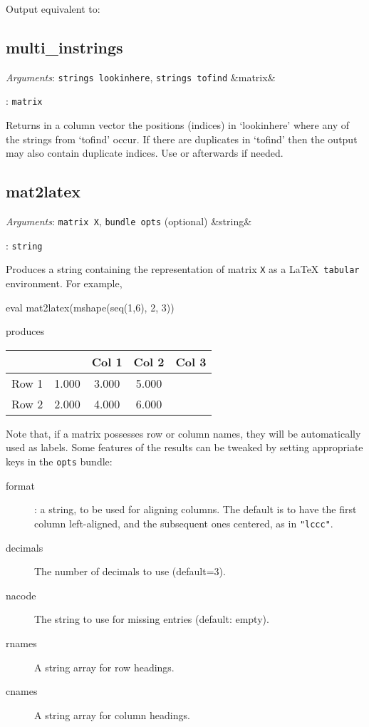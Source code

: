 \documentclass[11pt,english]{article}
\newcommand{\ArgRet}[2]{%
  {\it Arguments}: {#1}%
  \ifx&#2&%
  \else
  \par\smallskip\noindent {\it Return type}: \texttt{#2}
  \fi%
  \par\medskip\par%
  }
\begin{document}
Output equivalent to:


\subsection{multi\_instrings}

\ArgRet{\texttt{strings lookinhere}, \texttt{strings tofind}}{matrix}

Returns in a column vector the positions (indices) in `lookinhere' where any of the
strings from `tofind' occur. If there are duplicates in `tofind' then the output
may also contain duplicate indices. Use  or  afterwards if needed.

\subsection{mat2latex}

\ArgRet{\texttt{matrix X}, \texttt{bundle opts} (optional)}{string}

Produces a string containing the representation of matrix \texttt{X}
as a \LaTeX\ \texttt{tabular} environment. For example,
\begin{code}
eval mat2latex(mshape(seq(1,6), 2, 3))
\end{code}
produces
\begin{code}
\begin{tabular}{lccc}
\hline
 &	  &	 Col 1  &	 Col 2  &	 Col 3 \\ \hline
Row 1 & 1.000	 & 3.000	 & 5.000 \\
Row 2 & 2.000	 & 4.000	 & 6.000 \\
\hline
\end{tabular}
\end{code}
Note that, if a matrix possesses row or column names, they will be
automatically used as labels. Some features of the results can be
tweaked by setting appropriate keys in the \texttt{opts} bundle:
\begin{description}
\item[format]: a string, to be used for aligning columns. The default
  is to have the first column left-aligned, and the subsequent ones
  centered, as in \texttt{"lccc"}.
\item[decimals] The number of decimals to use (default=3).
\item[nacode] The string to use for missing entries (default: empty).
\item[rnames] A string array for row headings.
\item[cnames] A string array for column headings.
\end{description}
\end{document}
